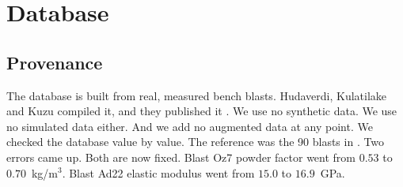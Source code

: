 \documentclass[conference]{IEEEtran}
\begin{document}
\section{Database}
\label{sec:data}
\subsection{Provenance}
The database is built from real, measured bench blasts. Hudaverdi, Kulatilake and Kuzu compiled it, and they published it
\cite{hudaverdi2011,kulatilake2010}. We use no synthetic data. We use no simulated data either. And we add no augmented data at any point. We checked the database value by value. The reference was the 90 blasts in \cite{kulatilake2010}. Two errors came up. Both are now fixed. Blast Oz7 powder factor went from
$0.53$ to $0.70$~kg/m$^3$. Blast Ad22 elastic modulus went from
$15.0$ to $16.9$~GPa.

\begin{table}[t]
\centering
\caption{Mines and quarries in the database}
\label{tab:sites}
\footnotesize
{}
\end{table}
\end{document}
